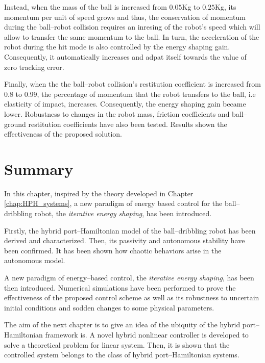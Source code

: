 Instead, when the mass of the ball is increased from $0.05$Kg to $0.25$Kg, its momentum per unit of speed grows and thus, the conservation of momentum during the ball--robot collision requires an inresing of the robot's speed which will allow to transfer the same momentum to the ball. In turn, the acceleration of the robot during the hit mode is also controlled by the energy shaping gain. Consequently, it automatically increases and adpat itself towards the value of zero tracking error.

Finally, when the the ball--robot collision's restitution coefficient is increased from 0.8 to 0.99, the percentage of momentum that the robot transfers to the ball, i.e elasticity of impact, increases. Consequently, the energy shaping gain became lower.    
%
Robustness to changes in the robot mass, friction coefficients and ball--ground restitution coefficients have also been tested. Results shown the effectiveness of the proposed solution.
%
\clearpage
\section{Summary}\label{sec:concl}
%
In this chapter, inspired by the theory developed in Chapter \ref{chap:HPH_systems}, a new paradigm of energy based control for the ball--dribbling robot, the \textit{iterative energy shaping}, has been introduced.
%
\newline

%
Firstly, the hybrid port--Hamiltonian model of the ball--dribbling robot has been derived and characterized. Then, its passivity and autonomous stability have been confirmed. It has been shown how chaotic behaviors arise in the autonomous model.

A new paradigm of energy--based control, the \textit{iterative energy shaping}, has been then introduced. Numerical simulations have been performed to prove the effectiveness of the proposed control scheme as well as its robustness to uncertain initial conditions and sodden changes to some physical parameters. 
\newline

%
The aim of the next chapter is to give an idea of the ubiquity of the hybrid port--Hamiltonian framework is. A novel hybrid nonlinear controller is developed to solve a theoretical problem for linear system. Then, it is shown that the controlled system belongs to the class of hybrid port--Hamiltonian systems. 
